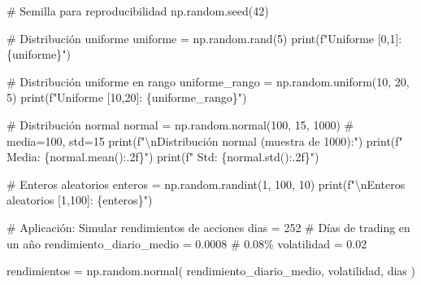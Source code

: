 \documentclass[
  doc,
  floatsintext,
  longtable,
  a4paper,
  nolmodern,
  notxfonts,
  notimes,
  12pt,
  colorlinks=true,linkcolor=blue,citecolor=blue,urlcolor=blue]{apa7}
\newenvironment{Shaded}{\begin{snugshade}}{\end{snugshade}}
\newcommand{\BuiltInTok}[1]{\textcolor[rgb]{0.00,0.23,0.31}{#1}}
\newcommand{\CharTok}[1]{\textcolor[rgb]{0.13,0.47,0.30}{#1}}
\newcommand{\CommentTok}[1]{\textcolor[rgb]{0.37,0.37,0.37}{#1}}
\newcommand{\DecValTok}[1]{\textcolor[rgb]{0.68,0.00,0.00}{#1}}
\newcommand{\FloatTok}[1]{\textcolor[rgb]{0.68,0.00,0.00}{#1}}
\newcommand{\NormalTok}[1]{\textcolor[rgb]{0.00,0.23,0.31}{#1}}
\newcommand{\OperatorTok}[1]{\textcolor[rgb]{0.37,0.37,0.37}{#1}}
\newcommand{\SpecialCharTok}[1]{\textcolor[rgb]{0.37,0.37,0.37}{#1}}
\newcommand{\SpecialStringTok}[1]{\textcolor[rgb]{0.13,0.47,0.30}{#1}}
\begin{document}
\begin{Shaded}
\begin{Highlighting}[]
\CommentTok{\# Semilla para reproducibilidad}
\NormalTok{np.random.seed(}\DecValTok{42}\NormalTok{)}

\CommentTok{\# Distribución uniforme}
\NormalTok{uniforme }\OperatorTok{=}\NormalTok{ np.random.rand(}\DecValTok{5}\NormalTok{)}
\BuiltInTok{print}\NormalTok{(}\SpecialStringTok{f"Uniforme [0,1]: }\SpecialCharTok{\{}\NormalTok{uniforme}\SpecialCharTok{\}}\SpecialStringTok{"}\NormalTok{)}

\CommentTok{\# Distribución uniforme en rango}
\NormalTok{uniforme\_rango }\OperatorTok{=}\NormalTok{ np.random.uniform(}\DecValTok{10}\NormalTok{, }\DecValTok{20}\NormalTok{, }\DecValTok{5}\NormalTok{)}
\BuiltInTok{print}\NormalTok{(}\SpecialStringTok{f"Uniforme [10,20]: }\SpecialCharTok{\{}\NormalTok{uniforme\_rango}\SpecialCharTok{\}}\SpecialStringTok{"}\NormalTok{)}

\CommentTok{\# Distribución normal}
\NormalTok{normal }\OperatorTok{=}\NormalTok{ np.random.normal(}\DecValTok{100}\NormalTok{, }\DecValTok{15}\NormalTok{, }\DecValTok{1000}\NormalTok{)  }\CommentTok{\# media=100, std=15}
\BuiltInTok{print}\NormalTok{(}\SpecialStringTok{f"}\CharTok{\textbackslash{}n}\SpecialStringTok{Distribución normal (muestra de 1000):"}\NormalTok{)}
\BuiltInTok{print}\NormalTok{(}\SpecialStringTok{f"  Media: }\SpecialCharTok{\{}\NormalTok{normal}\SpecialCharTok{.}\NormalTok{mean()}\SpecialCharTok{:.2f\}}\SpecialStringTok{"}\NormalTok{)}
\BuiltInTok{print}\NormalTok{(}\SpecialStringTok{f"  Std: }\SpecialCharTok{\{}\NormalTok{normal}\SpecialCharTok{.}\NormalTok{std()}\SpecialCharTok{:.2f\}}\SpecialStringTok{"}\NormalTok{)}

\CommentTok{\# Enteros aleatorios}
\NormalTok{enteros }\OperatorTok{=}\NormalTok{ np.random.randint(}\DecValTok{1}\NormalTok{, }\DecValTok{100}\NormalTok{, }\DecValTok{10}\NormalTok{)}
\BuiltInTok{print}\NormalTok{(}\SpecialStringTok{f"}\CharTok{\textbackslash{}n}\SpecialStringTok{Enteros aleatorios [1,100]: }\SpecialCharTok{\{}\NormalTok{enteros}\SpecialCharTok{\}}\SpecialStringTok{"}\NormalTok{)}

\CommentTok{\# Aplicación: Simular rendimientos de acciones}
\NormalTok{dias }\OperatorTok{=} \DecValTok{252}  \CommentTok{\# Días de trading en un año}
\NormalTok{rendimiento\_diario\_medio }\OperatorTok{=} \FloatTok{0.0008}  \CommentTok{\# 0.08\%}
\NormalTok{volatilidad }\OperatorTok{=} \FloatTok{0.02}

\NormalTok{rendimientos }\OperatorTok{=}\NormalTok{ np.random.normal(}
\NormalTok{    rendimiento\_diario\_medio,}
\NormalTok{    volatilidad,}
\NormalTok{    dias}
\NormalTok{)}


\end{Highlighting}
\end{Shaded}
\end{document}
